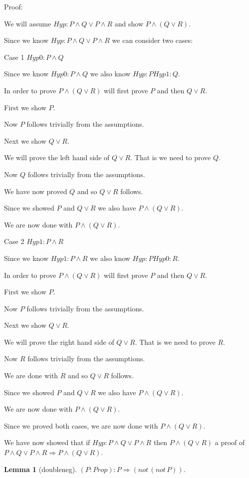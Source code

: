 \documentclass[11pt, oneside]{article}
\newtheorem{Lemma}{Lemma}
\begin{document}
 Proof: \begin{subproof}We will assume $Hyp : P \land Q \lor P \land R $ and show $P \land (Q \lor R) $.\begin{subproof}Since we know $Hyp : P \land Q \lor P \land R $ we can consider two cases: 

 Case 1 $Hyp0 : P \land Q $

 \begin{subproof}Since we know $Hyp0 : P \land Q $ we also know $Hyp : P 
Hyp1 : Q $.\begin{subproof}In order to prove $P \land (Q \lor R) $ will first prove $P $ and then $Q \lor R $.

 First we show $P $.\begin{subproof}Now $P $ follows trivially from the assumptions.\end{subproof} Next we show $Q \lor R $.\begin{subproof}We will prove the left hand side of $Q \lor R $. That is we need to prove $Q $.\begin{subproof}Now $Q $ follows trivially from the assumptions.\end{subproof} We have now proved $Q $ and so $Q \lor R $ follows.\end{subproof} Since we showed $P $ and $Q \lor R $ we also have $P \land (Q \lor R) $.\end{subproof} We are now done with $P \land (Q \lor R) $.\end{subproof} 

 Case 2 $Hyp1 : P \land R $

 \begin{subproof}Since we know $Hyp1 : P \land R $ we also know $Hyp : P 
Hyp0 : R $.\begin{subproof}In order to prove $P \land (Q \lor R) $ will first prove $P $ and then $Q \lor R $.

 First we show $P $.\begin{subproof}Now $P $ follows trivially from the assumptions.\end{subproof} Next we show $Q \lor R $.\begin{subproof}We will prove the right hand side of $Q \lor R $. That is we need to prove $R $.\begin{subproof}Now $R $ follows trivially from the assumptions.\end{subproof} We are done with $R $ and so $Q \lor R $ follows.\end{subproof} Since we showed $P $ and $Q \lor R $ we also have $P \land (Q \lor R) $.\end{subproof} We are now done with $P \land (Q \lor R) $.\end{subproof} Since we proved both cases, we are now done with $P \land (Q \lor R) $.\end{subproof} We have now showed that if $Hyp : P \land Q \lor P \land R $ then $P \land (Q \lor R) $ a proof of $P \land Q \lor P \land R \Rightarrow P \land (Q \lor R) $.\end{subproof}\begin{Lemma}[doubleneg] 
$(P:Prop):P\Rightarrow (not\,(not\,P)).$
 \end{Lemma}
\end{document}
